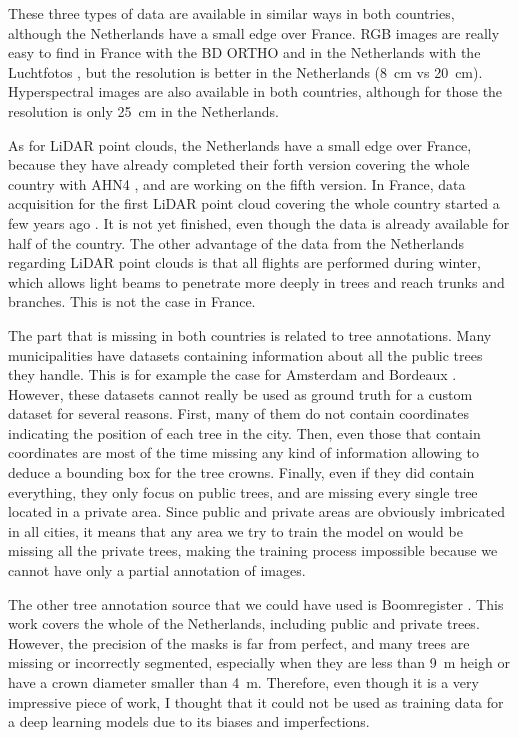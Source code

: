 \documentclass[
  letterpaper,
  DIV=11,
  numbers=noendperiod]{scrartcl}
\begin{document}
These three types of data are available in similar ways in both
countries, although the Netherlands have a small edge over France. RGB
images are really easy to find in France with the BD ORTHO
\autocite{IGN_BD_ORTHO} and in the Netherlands with the Luchtfotos
\autocite{Luchtfotos}, but the resolution is better in the Netherlands
(8~cm vs 20~cm). Hyperspectral images are also available in both
countries, although for those the resolution is only 25~cm in the
Netherlands.

As for LiDAR point clouds, the Netherlands have a small edge over
France, because they have already completed their forth version covering
the whole country with AHN4 \autocite{AHN4}, and are working on the
fifth version. In France, data acquisition for the first LiDAR point
cloud covering the whole country started a few years ago
\autocite{IGN_LiDAR_HD}. It is not yet finished, even though the data is
already available for half of the country. The other advantage of the
data from the Netherlands regarding LiDAR point clouds is that all
flights are performed during winter, which allows light beams to
penetrate more deeply in trees and reach trunks and branches. This is
not the case in France.

The part that is missing in both countries is related to tree
annotations. Many municipalities have datasets containing information
about all the public trees they handle. This is for example the case for
Amsterdam \autocite{amsterdam_trees} and Bordeaux
\autocite{bordeaux_trees}. However, these datasets cannot really be used
as ground truth for a custom dataset for several reasons. First, many of
them do not contain coordinates indicating the position of each tree in
the city. Then, even those that contain coordinates are most of the time
missing any kind of information allowing to deduce a bounding box for
the tree crowns. Finally, even if they did contain everything, they only
focus on public trees, and are missing every single tree located in a
private area. Since public and private areas are obviously imbricated in
all cities, it means that any area we try to train the model on would be
missing all the private trees, making the training process impossible
because we cannot have only a partial annotation of images.

The other tree annotation source that we could have used is Boomregister
\autocite{boomregister}. This work covers the whole of the Netherlands,
including public and private trees. However, the precision of the masks
is far from perfect, and many trees are missing or incorrectly
segmented, especially when they are less than 9~m heigh or have a crown
diameter smaller than 4~m. Therefore, even though it is a very
impressive piece of work, I thought that it could not be used as
training data for a deep learning models due to its biases and
imperfections.
\end{document}
